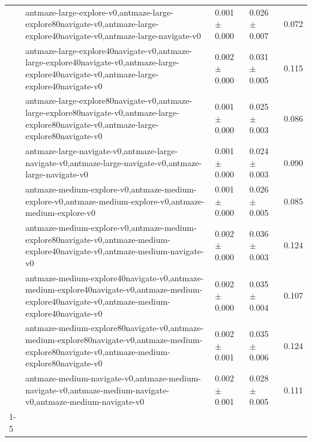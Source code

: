 \begin{tabular}{lllll}
 & antmaze-large-explore-v0,antmaze-large-explore80navigate-v0,antmaze-large-explore40navigate-v0,antmaze-large-navigate-v0 & 0.001 $\pm$ 0.000 & 0.026 $\pm$ 0.007 & 0.072 \\
 & antmaze-large-explore40navigate-v0,antmaze-large-explore40navigate-v0,antmaze-large-explore40navigate-v0,antmaze-large-explore40navigate-v0 & 0.002 $\pm$ 0.000 & 0.031 $\pm$ 0.005 & 0.115 \\
 & antmaze-large-explore80navigate-v0,antmaze-large-explore80navigate-v0,antmaze-large-explore80navigate-v0,antmaze-large-explore80navigate-v0 & 0.001 $\pm$ 0.000 & 0.025 $\pm$ 0.003 & 0.086 \\
 & antmaze-large-navigate-v0,antmaze-large-navigate-v0,antmaze-large-navigate-v0,antmaze-large-navigate-v0 & 0.001 $\pm$ 0.000 & 0.024 $\pm$ 0.003 & 0.090 \\
 & antmaze-medium-explore-v0,antmaze-medium-explore-v0,antmaze-medium-explore-v0,antmaze-medium-explore-v0 & 0.001 $\pm$ 0.000 & 0.026 $\pm$ 0.005 & 0.085 \\
 & antmaze-medium-explore-v0,antmaze-medium-explore80navigate-v0,antmaze-medium-explore40navigate-v0,antmaze-medium-navigate-v0 & 0.002 $\pm$ 0.000 & 0.036 $\pm$ 0.003 & 0.124 \\
 & antmaze-medium-explore40navigate-v0,antmaze-medium-explore40navigate-v0,antmaze-medium-explore40navigate-v0,antmaze-medium-explore40navigate-v0 & 0.002 $\pm$ 0.000 & 0.035 $\pm$ 0.004 & 0.107 \\
 & antmaze-medium-explore80navigate-v0,antmaze-medium-explore80navigate-v0,antmaze-medium-explore80navigate-v0,antmaze-medium-explore80navigate-v0 & 0.002 $\pm$ 0.001 & 0.035 $\pm$ 0.006 & 0.124 \\
 & antmaze-medium-navigate-v0,antmaze-medium-navigate-v0,antmaze-medium-navigate-v0,antmaze-medium-navigate-v0 & 0.002 $\pm$ 0.001 & 0.028 $\pm$ 0.005 & 0.111 \\
\cline{1-5}
\bottomrule
\end{tabular}

